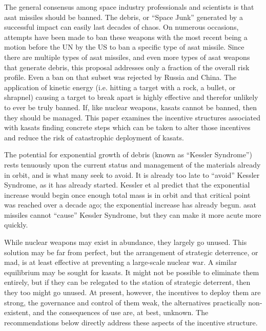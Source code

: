 
\maketitle

\pagestyle{execSummary}
\thispagestyle{firstPage}



The general consensus among space industry professionals and
scientists is that \ac{asat} missiles should be banned.  The debris,
or ``Space Junk'' generated by a successful impact can easily last
decades of chaos.  On numerous occasions, attempts have been made to
ban these weapons with the most recent being a motion before the UN by
the US to ban a specific type of \ac{asat} missile.  Since there are
multiple types of \ac{asat} missiles, and even more types of \ac{asat}
weapons that generate debris, this proposal addresses only a fraction
of the overall risk profile.  Even a ban on that subset was rejected
by Russia and China.  The application of kinetic energy (i.e. hitting
a target with a rock, a bullet, or shrapnel) causing a target to break
apart is highly effective and therefor unlikely to ever be truly
banned.  If, like nuclear weapons, \acp{kasat} cannot be banned, then
they should be managed.  This paper examines the incentive structures
associated with \acp{kasat} finding concrete steps which can be taken
to alter those incentives and reduce the risk of catastrophic
deployment of \acp{kasat}.

The potential for exponential growth of debris (known as ``Kessler
Syndrome'') rests tenuously upon the current status and management of
the materials already in orbit, and is what many seek to avoid.  It is
already too late to ``avoid'' Kessler Syndrome, as it has already
started.  Kessler et al predict that the exponential increase would
begin once enough total mass is in orbit and that critical point was
reached over a decade ago; the exponential increase has already begun.
\ac{asat} missiles cannot ``cause'' Kessler Syndrome, but they can
make it more acute more quickly.

While nuclear weapons may exist in abundance, they largely go unused.
This solution may be far from perfect, but the arrangement of
strategic deterrence, or \ac{mad}, is at least effective at preventing
a large-scale nuclear war.  A similar equilibrium may be sought for
\acp{kasat}.  It might not be possible to eliminate them entirely, but
if they can be relegated to the station of strategic deterrent, then
they too might go unused.  At present, however, the incentives to
deploy them are strong, the governance and control of them weak, the
alternatives practically non-existent, and the consequences of use
are, at best, unknown.  The recommendations below directly address
these aspects of the incentive structure.

